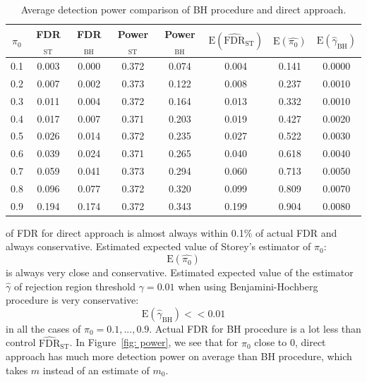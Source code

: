 \documentclass[10pt]{article}
\begin{document}
\begin{table}[H]
	\centering	
	\begin{tabular}{cccccccc}
		$\pi_{0}$ & FDR$_{\text{ST}}$ & FDR$_{\text{BH}}$ & Power$_{\text{ST}}$ & Power$_{\text{BH}}$ & $\text{E} (\widehat{\text{FDR}}_{\text{ST}} )$ & $\text{E}(\widehat{\pi_{0}})$ & $\text{E}(\widehat{\gamma}_{\text{BH}})$ \\ 
		\hline
		0.1 & 0.003 & 0.000 & 0.372 & 0.074 & 0.004 & 0.141 & 0.0000 \\ 
		0.2 & 0.007 & 0.002 & 0.373 & 0.122 & 0.008 & 0.237 & 0.0010 \\ 
		0.3 & 0.011 & 0.004 & 0.372 & 0.164 & 0.013 & 0.332 & 0.0010 \\ 
		0.4 & 0.017 & 0.007 & 0.371 & 0.203 & 0.019 & 0.427 & 0.0020 \\ 
		0.5 & 0.026 & 0.014 & 0.372 & 0.235 & 0.027 & 0.522 & 0.0030 \\ 
		0.6 & 0.039 & 0.024 & 0.371 & 0.265 & 0.040 & 0.618 & 0.0040 \\ 
		0.7 & 0.059 & 0.041 & 0.373 & 0.294 & 0.060 & 0.713 & 0.0050 \\ 
		0.8 & 0.096 & 0.077 & 0.372 & 0.320 & 0.099 & 0.809 & 0.0070 \\ 
		0.9 & 0.194 & 0.174 & 0.372 & 0.343 & 0.199 & 0.904 & 0.0080 \\ 
		\hline
	\end{tabular}
	\caption{Average detection power comparison of BH procedure and direct approach.}
	\label{tab: power}	
\end{table}

of FDR for direct approach is almost always within 0.1\% of actual FDR and always conservative. Estimated expected value of Storey's estimator of $\pi_{0}$:
\begin{equation}
\text{E}(\widehat{\pi_{0}})
\end{equation} 
is always very close and conservative. Estimated expected value of the estimator $\widehat{\gamma}$ of rejection region threshold $\gamma = 0.01$ when using Benjamini-Hochberg procedure is very conservative:
\begin{equation}
\text{E}(\widehat{\gamma}_{\text{BH}}) << 0.01
\end{equation}
in all the cases of $\pi_{0} = 0.1, ..., 0.9$. Actual FDR for BH procedure is a lot less than control $\widehat{\text{FDR}}_{\text{ST}}$. In Figure~\ref{fig: power}, we see that for $\pi_{0}$ close to 0, direct approach has much more detection power on average than BH procedure, which takes $m$ instead of an estimate of $m_{0}$.
\end{document}
